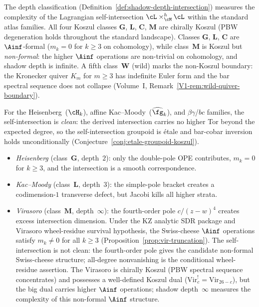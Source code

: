 \begin{remark}
\label{rem:koszul-clean-landscape}
The depth classification
(Definition~\ref{def:shadow-depth-intersection})
measures the complexity of the Lagrangian self-intersection
$\cL \times_{\cM}^h \cL$ within the standard atlas families.
All four Koszul classes $\mathbf{G}$, $\mathbf{L}$, $\mathbf{C}$,
$\mathbf{M}$ are chirally Koszul (PBW degeneration holds
throughout the standard landscape). Classes $\mathbf{G}$,
$\mathbf{L}$, $\mathbf{C}$ are $\Ainf$-formal
($m_k = 0$ for $k \ge 3$ on cohomology), while
class~$\mathbf{M}$ is Koszul but \emph{non-formal}: the
higher $\Ainf$ operations are non-trivial on cohomology,
and shadow depth is infinite. A fifth class~$\mathbf{W}$
(wild) marks the non-Koszul boundary: the Kronecker quiver
$K_m$ for $m \geq 3$ has indefinite Euler form and the bar
spectral sequence does not collapse
(Volume~I, Remark~\ref*{V1-rem:wild-quiver-boundary}).

For the Heisenberg~($\cH_k$), affine
Kac--Moody~($\widehat{\fg}_k$), and $\beta\gamma$/$bc$
families, the self-intersection is \emph{clean}: the derived
intersection carries no higher Tor beyond the expected degree,
so the self-intersection groupoid is \'etale and bar-cobar
inversion holds unconditionally
(Conjecture~\ref{conj:etale-groupoid-koszul}).
\begin{itemize}[nosep]
\item \emph{Heisenberg} (class~$\mathbf{G}$, depth~$2$):
 only the double-pole OPE contributes, $m_k = 0$ for
 $k \ge 3$, and the intersection is a smooth correspondence.
\item \emph{Kac--Moody} (class~$\mathbf{L}$, depth~$3$):
 the simple-pole bracket creates a codimension-$1$
 transverse defect, but Jacobi kills all higher strata.
\item \emph{Virasoro} (class~$\mathbf{M}$, depth~$\infty$):
 the fourth-order pole $c/(z-w)^4$ creates excess
 intersection dimension. Under the KZ analytic SDR package and
 Virasoro wheel-residue survival hypothesis, the Swiss-cheese
 $\Ainf$ operations satisfy $m_k \ne 0$ for all $k \ge 3$
 (Proposition~\ref{prop:vir-truncation}).
 The self-intersection is not clean: the fourth-order pole
 gives the candidate non-formal Swiss-cheese structure; all-degree
 nonvanishing is the conditional wheel-residue assertion.
 The Virasoro is chirally Koszul (PBW spectral sequence
 concentrates) and possesses a well-defined Koszul dual
 ($\mathrm{Vir}_c^! = \mathrm{Vir}_{26-c}$), but the
 big dual carries higher $\Ainf$ operations; shadow
 depth~$\infty$ measures the complexity of this
 non-formal $\Ainf$ structure.
\end{itemize}
\end{remark}


